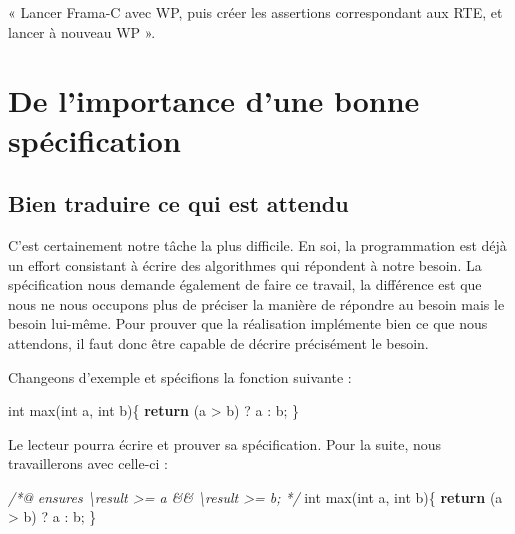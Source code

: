 \documentclass[12pt,francais,]{scrbook}
\newenvironment{Shaded}{}{}
\newcommand{\KeywordTok}[1]{\textcolor[rgb]{0.00,0.44,0.13}{\textbf{{#1}}}}
\newcommand{\DataTypeTok}[1]{\textcolor[rgb]{0.56,0.13,0.00}{{#1}}}
\newcommand{\CommentTok}[1]{\textcolor[rgb]{0.38,0.63,0.69}{\textit{{#1}}}}
\newcommand{\NormalTok}[1]{{#1}}
\begin{document}
« Lancer Frama-C avec WP, puis créer les assertions correspondant aux
RTE, et lancer à nouveau WP ».

\section{De l'importance d'une bonne
spécification}\label{de-limportance-dune-bonne-spuxe9cification}

\subsection{Bien traduire ce qui est
attendu}\label{bien-traduire-ce-qui-est-attendu}

C'est certainement notre tâche la plus difficile. En soi, la
programmation est déjà un effort consistant à écrire des algorithmes qui
répondent à notre besoin. La spécification nous demande également de
faire ce travail, la différence est que nous ne nous occupons plus de
préciser la manière de répondre au besoin mais le besoin lui-même. Pour
prouver que la réalisation implémente bien ce que nous attendons, il
faut donc être capable de décrire précisément le besoin.

Changeons d'exemple et spécifions la fonction suivante :

\begin{footnotesize}\begin{Shaded}
\begin{Highlighting}[]
\DataTypeTok{int} \NormalTok{max(}\DataTypeTok{int} \NormalTok{a, }\DataTypeTok{int} \NormalTok{b)\{}
  \KeywordTok{return} \NormalTok{(a > b) ? a : b;}
\NormalTok{\}}
\end{Highlighting}
\end{Shaded}\end{footnotesize}

Le lecteur pourra écrire et prouver sa spécification. Pour la suite,
nous travaillerons avec celle-ci :

\begin{footnotesize}\begin{Shaded}
\begin{Highlighting}[]
\CommentTok{/*@}
\CommentTok{  ensures \textbackslash{}result >= a && \textbackslash{}result >= b;}
\CommentTok{*/}
\DataTypeTok{int} \NormalTok{max(}\DataTypeTok{int} \NormalTok{a, }\DataTypeTok{int} \NormalTok{b)\{}
  \KeywordTok{return} \NormalTok{(a > b) ? a : b;}
\NormalTok{\}}
\end{Highlighting}
\end{Shaded}\end{footnotesize}
\end{document}
